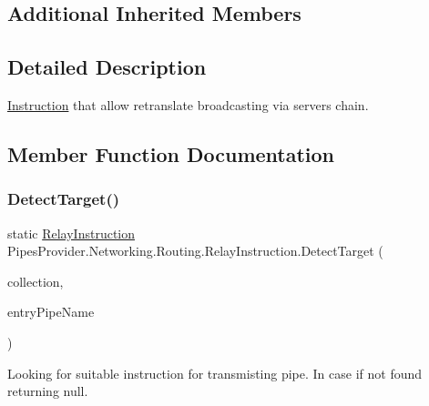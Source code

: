 \subsection*{Additional Inherited Members}


\subsection{Detailed Description}
\mbox{\hyperlink{class_pipes_provider_1_1_networking_1_1_routing_1_1_instruction}{Instruction}} that allow retranslate broadcasting via servers chain. 



\subsection{Member Function Documentation}
\mbox{\label{class_pipes_provider_1_1_networking_1_1_routing_1_1_relay_instruction_a94279d5a766e562f152ce612827fcbe8}} 
\subsubsection{\texorpdfstring{Detect\+Target()}{DetectTarget()}}
{\footnotesize\ttfamily static \mbox{\hyperlink{class_pipes_provider_1_1_networking_1_1_routing_1_1_relay_instruction}{Relay\+Instruction}} Pipes\+Provider.\+Networking.\+Routing.\+Relay\+Instruction.\+Detect\+Target (\begin{DoxyParamCaption}\item[{I\+Enumerable$<$ \mbox{\hyperlink{class_pipes_provider_1_1_networking_1_1_routing_1_1_instruction}{Instruction}} $>$}]{collection,  }\item[{string}]{entry\+Pipe\+Name }\end{DoxyParamCaption})\hspace{0.3cm}{\ttfamily [static]}}



Looking for suitable instruction for transmisting pipe. In case if not found returning null. 


